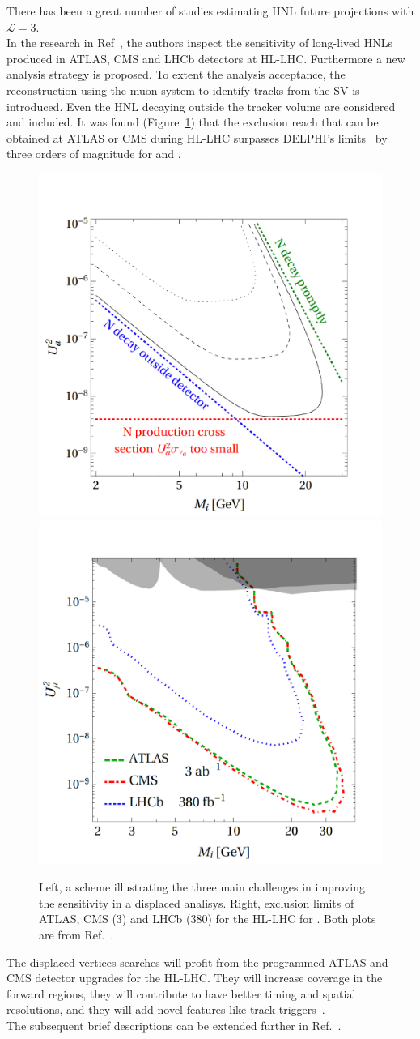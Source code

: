 There has been a great number of studies estimating HNL future
projections with $\mathcal{L} = 3$\abinv.\\
In the research in Ref~\cite{Drewes_2020_jan}, the authors inspect the
sensitivity of long-lived HNLs produced in ATLAS, CMS and LHCb
detectors at HL-LHC. Furthermore a new analysis strategy is proposed. To extent
the analysis acceptance, the reconstruction using the muon system to identify tracks from the
SV is introduced. Even the HNL decaying outside the tracker
volume are considered and included. It was found
(Figure~\ref{fig:marco_sketch_ll}) that the exclusion
reach that can be obtained at ATLAS or CMS during HL-LHC surpasses
DELPHI's limits~\cite{Abreu:1996pa} by three orders of magnitude for
\mixparm and \mixpare.\\

\begin{figure}[h!]
\centering
    \includegraphics[clip,trim=0.cm 0cm 0cm 2cm, width=.38\textwidth]{Figures/c7/marco_god.pdf}
    \includegraphics[clip,trim=0.cm 0cm 0cm 2cm, width=.37\textwidth]{Figures/c7/marco_mu_HL.pdf}
\caption{Left, a scheme illustrating the three main challenges in
  improving the sensitivity in a displaced analisys. Right, exclusion
  limits of ATLAS, CMS (3\abinv) and LHCb (380\fbinv)
 for the HL-LHC for \mixparm. Both plots are
  from Ref.~\cite{Drewes_2020_jan}. }
\label{fig:marco_sketch_ll}
\end{figure}


The displaced vertices
searches will profit from the programmed ATLAS and CMS detector
upgrades for the HL-LHC. 
They will increase coverage in the forward regions, they
will contribute to have better timing and spatial resolutions, and
they will add novel features like track
triggers~\cite{Alimena_2020}.\\
The subsequent brief descriptions can be extended further
in
Ref.~\cite{CERN-LHCC-2017-009,CERN-LHCC-2017-011,CERN-LHCC-2017-012,CERN-LHCC-2017-027,CERN-LHCC-2017-013}.


